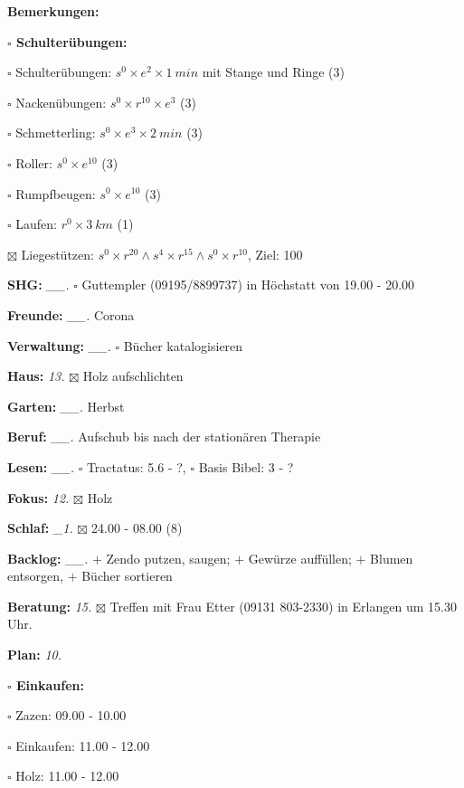\documentclass[10pt,a4paper]{article}
\newcommand\prop[1] {{\color {alizarin} {\bf #1}}}        %
\newcommand\opti[1] {{\color {amethyst} {\bf #1}}}        %
\newcommand\mand[1] {{\color {burntorange} {\bf #1}}}     %
\newcommand\topspace{\vskip -15pt \hskip 20pt}
\newcommand\bottomspace{\vskip 4pt}
\newcommand\n[1] { {\sl #1.} \hskip 5pt }
\begin{document}
\begin{mdframed}[style=daystyle]
\begin{labeling}{{\mand {Bemerkungen:}}}
\begin{minipage}{0.75\textwidth}
\begin{labeling}{\prop {$\square$ {Schulterübungen:}}}
        \setlength\itemsep{-3pt}
      \item[$\square$ Schulterübungen:] $s^0 \times e^2 \times 1\ min$ mit Stange und Ringe (3)
      \item[$\square$ Nackenübungen:]   $s^0 \times r^{10} \times e^3$ (3)
      \item[$\square$ Schmetterling:]   $s^0 \times e^3 \times 2\ min$ (3)
      \item[$\square$ Roller:]          $s^0 \times e^{10}$ (3)
      \item[$\square$ Rumpfbeugen:]     $s^0 \times e^{10}$ (3)
      \item[$\square$ Laufen:]          $r^0 \times 3\ km$ (1)
      \item[$\boxtimes$ Liegestützen:] $s^0 \times r^{20} \land s^4 \times r^{15} \land s^0 \times r^{10}$, Ziel: 100
      \end{labeling}
    \end{minipage}
    \bottomspace        
  \item[{\mand {SHG:}}]          \n{\_\_} $\square$ Guttempler (09195/8899737) in Höchstatt von 19.00 - 20.00
  \item[{\mand {Freunde:}}]      \n{\_\_} Corona
  \item[{\mand {Verwaltung:}}]   \n{\_\_} $\square$ Bücher katalogisieren
  \item[{\mand {Haus:}}]           \n{13} $\boxtimes$ Holz aufschlichten
  \item[{\mand {Garten:}}]       \n{\_\_} Herbst
  \item[{\mand {Beruf:}}]        \n{\_\_} Aufschub bis nach der stationären Therapie
  \item[{\mand {Lesen:}}]        \n{\_\_} $\square$ Tractatus: 5.6 - ?, $\square$ Basis Bibel: 3 - ?
  \item[{\mand {Fokus:}}]          \n{12} $\boxtimes$ Holz
  \item[{\mand {Schlaf:}}]        \n{\_1} $\boxtimes$ 24.00 - 08.00 (8)
  \item[{\mand {Backlog:}}]      \n{\_\_} 
    $+$ Zendo putzen, saugen; $+$ Gewürze auffüllen; $+$ Blumen entsorgen, $+$ Bücher sortieren
  \item[{\opti {Beratung:}}]       \n{15} $\boxtimes$ Treffen mit Frau Etter (09131 803-2330) in Erlangen um 15.30 Uhr.
  \item[{\mand {Plan:}}]           \n{10}
    \topspace
    \begin{minipage}{0.75\textwidth}  
      \begin{labeling}{\prop {$\square$ {Einkaufen:}}} 
        \setlength\itemsep{-3pt}
      \item[$\square$ Zazen:]     09.00 - 10.00
      \item[$\square$ Einkaufen:] 11.00 - 12.00
      \item[$\square$ Holz:]      11.00 - 12.00
        

\end{labeling}
\end{minipage}
\end{labeling}
\end{mdframed}
\end{document}

